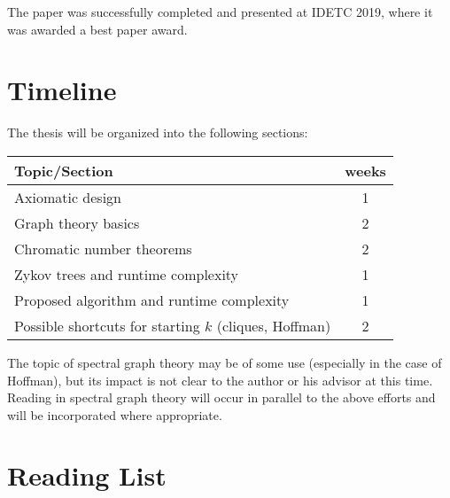 \documentclass[letterpaper,12pt]{article}
\begin{document}
The paper was successfully completed and presented at IDETC 2019, where it was awarded a best paper award.

\section*{Timeline}

The thesis will be organized into the following sections:

\begin{tabular}{|l|c|}
  \hline
  \textbf{Topic/Section} & \textbf{weeks} \\
  \hline
  Axiomatic design & 1 \\
  Graph theory basics & 2 \\
  Chromatic number theorems & 2 \\
  Zykov trees and runtime complexity & 1 \\
  Proposed algorithm and runtime complexity & 1 \\
  Possible shortcuts for starting \(k\) (cliques, Hoffman) & 2 \\
  \hline
\end{tabular}

The topic of spectral graph theory may be of some use (especially in the case of Hoffman), but its impact is not
clear to the author or his advisor at this time.  Reading in spectral graph theory will occur in parallel to the
above efforts and will be incorporated where appropriate.

\section*{Reading List}

\begingroup
\renewcommand{\section}[2]{}%
\nocite{*}
 

\endgroup
\end{document}
